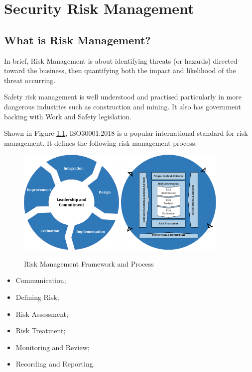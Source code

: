 \chapter{Security Risk Management}
\section{What is Risk Management?}
In brief, Risk Management is about identifying threats (or hazards) directed toward the business, then quantifying both the impact and likelihood of the threat occurring.

Safety risk management is well understood and practised particularly in more dangerous industries such as construction and mining. It also has government backing with Work and Safety legislation.

Shown in Figure \ref{fig:Risk}, ISO30001:2018 is a popular international standard for risk management. It defines the following risk management process:
\begin{figure}[h] \label{fig:Risk}
	\centering
	\includegraphics[width=0.45\textwidth]{./TeX_files/Framework1.png}	\includegraphics[width=0.45\textwidth]{./TeX_files/Process1.png}
	\caption{Risk Management Framework and Process}
\end{figure}

\begin{itemize}
	\item Communication;
	\item Defining Risk;
	\item Risk Assessment;
	\item Risk Treatment;
	\item Monitoring and Review;
	\item Recording and Reporting.
\end{itemize}
